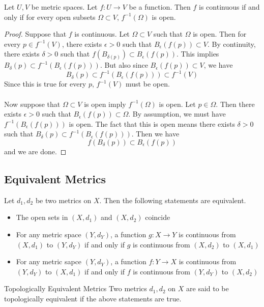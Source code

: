 \documentclass[a4paper]{article}
\begin{document}
\begin{thm}{}{} Let $U,V$ be metric spaces. Let $f:U\to V$ be a function. Then $f$ is continuous if and only if for every open subsets $\Omega\subset V$, $f^{-1}(\Omega)$ is open. \tcbline
\begin{proof} Suppose that $f$ is continuous. Let $\Omega\subset V$ such that $\Omega$ is open. Then for every $p\in f^{-1}(V)$, there exists $\epsilon>0$ such that $B_{\epsilon}(f(p))\subset V$. By continuity, there exists $\delta>0$ such that $f(B_{\delta(p)})\subset B_{\epsilon}(f(p))$. This implies $B_{\delta}(p)\subset f^{-1}(B_{\epsilon}(f(p)))$. But also since $B_{\epsilon}(f(p))\subset V$, we have $$B_{\delta}(p)\subset f^{-1}(B_{\epsilon}(f(p)))\subset f^{-1}(V)$$ Since this is true for every $p$, $f^{-1}(V)$ must be open. \\~\\
Now suppose that $\Omega\subset V$ is open imply $f^{-1}(\Omega)$ is open. Let $p\in \Omega$. Then there exists $\epsilon>0$ such that $B_{\epsilon}(f(p))\subset\Omega$. By assumption, we must have $f^{-1}(B_{\epsilon}(f(p)))$ is open. The fact that this is open means there exists $\delta>0$ such that $B_{\delta}(p)\subset f^{-1}(B_{\epsilon}(f(p)))$. Then we have $$f(B_{\delta}(p))\subset B_{\epsilon}(f(p))$$
and we are done. 
\end{proof}
\end{thm}

\subsection{Equivalent Metrics}
\begin{thm}{}{} Let $d_1,d_2$ be two metrics on $X$. Then the following statements are equivalent. 
\begin{itemize}
\item The open sets in $(X,d_1)$ and $(X,d_2)$ coincide
\item For any metric space $(Y,d_Y)$, a function $g:X\to Y$ is continuous from $(X,d_1)$ to $(Y,d_Y)$ if and only if $g$ is continuous from $(X,d_2)$ to $(X,d_1)$
\item For any metric sapce $(Y,d_Y)$, a function $f:Y\to X$ is continuous from $(Y,d_Y)$ to $(X,d_1)$ if and only if $f$ is continuous from $(Y,d_Y)$ to $(X,d_2)$
\end{itemize}
\end{thm}

\begin{defn}{Topologically Equivalent Metrics}{} Two metrics $d_1,d_2$ on $X$ are said to be topologically equivalent if the above statements are true. 
\end{defn}
\end{document}
